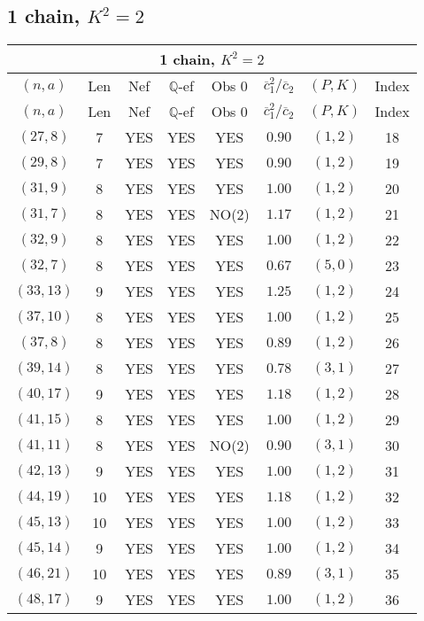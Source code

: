 \subsection{1 chain, $K^2 = 2$}
\begin{longtable}{|c|c|c|c|c|c|c|c|}
\hline
\multicolumn{8}{|c|}{1 chain, $K^2 = 2$}\\
\hline
$(n,a)$ & Len & Nef & $\mathbb Q$-ef & Obs 0 & $\overline c_1^2 / \overline c_2$ & $(P,K)$ & Index\\
\hline
\endfirsthead

\hline
$(n,a)$ & Len & Nef & $\mathbb Q$-ef & Obs 0 & $\overline c_1^2 / \overline c_2$ & $(P,K)$ & Index\\
\hline
\endhead
\hline
\endfoot

$(27,8)$ & 7 & YES & YES & YES & $0.90$ & $(1,2)$ & 18\\
$(29,8)$ & 7 & YES & YES & YES & $0.90$ & $(1,2)$ & 19\\
$(31,9)$ & 8 & YES & YES & YES & $1.00$ & $(1,2)$ & 20\\
$(31,7)$ & 8 & YES & YES & NO(2) & $1.17$ & $(1,2)$ & 21\\
$(32,9)$ & 8 & YES & YES & YES & $1.00$ & $(1,2)$ & 22\\
$(32,7)$ & 8 & YES & YES & YES & $0.67$ & $(5,0)$ & 23\\
$(33,13)$ & 9 & YES & YES & YES & $1.25$ & $(1,2)$ & 24\\
$(37,10)$ & 8 & YES & YES & YES & $1.00$ & $(1,2)$ & 25\\
$(37,8)$ & 8 & YES & YES & YES & $0.89$ & $(1,2)$ & 26\\
$(39,14)$ & 8 & YES & YES & YES & $0.78$ & $(3,1)$ & 27\\
$(40,17)$ & 9 & YES & YES & YES & $1.18$ & $(1,2)$ & 28\\
$(41,15)$ & 8 & YES & YES & YES & $1.00$ & $(1,2)$ & 29\\
$(41,11)$ & 8 & YES & YES & NO(2) & $0.90$ & $(3,1)$ & 30\\
$(42,13)$ & 9 & YES & YES & YES & $1.00$ & $(1,2)$ & 31\\
$(44,19)$ & 10 & YES & YES & YES & $1.18$ & $(1,2)$ & 32\\
$(45,13)$ & 10 & YES & YES & YES & $1.00$ & $(1,2)$ & 33\\
$(45,14)$ & 9 & YES & YES & YES & $1.00$ & $(1,2)$ & 34\\
$(46,21)$ & 10 & YES & YES & YES & $0.89$ & $(3,1)$ & 35\\
$(48,17)$ & 9 & YES & YES & YES & $1.00$ & $(1,2)$ & 36\\

\end{longtable}
